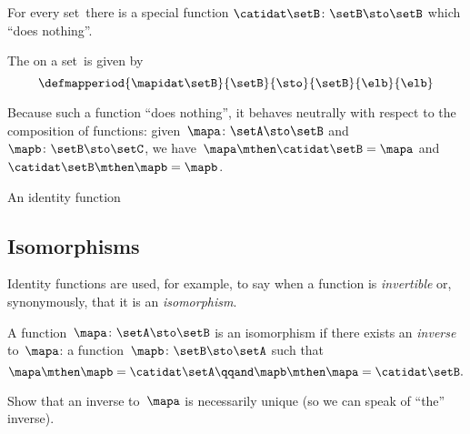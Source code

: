 For every set~\setB there is a special function $\catidat\setB \colon \setB \sto \setB$ which ``does nothing''.
\begin{ctdefinition}\label{def:identity-function}
    The  on a set~\setB is given by
    \begin{equation}
        \defmapperiod{
            \mapidat\setB
        }{
            \setB
        }{
            \sto
        }{
            \setB
        }{
            \elb
        }{
            \elb
        }
    \end{equation}
\end{ctdefinition}
Because such a function ``does nothing'', it behaves neutrally with respect to the composition of functions: given~$\mapa \colon \setA \sto \setB$ and~$\mapb \colon \setB \sto \setC$, we have~$\mapa \mthen \catidat\setB = \mapa$ and~$\catidat\setB \mthen \mapb = \mapb$.

\begin{marginfigure}
    \centering
    \caption{An identity function}
    \label{fig:identity-function}
\end{marginfigure}

\subsection{Isomorphisms}

Identity functions are used, for example, to say when a function is \emph{invertible} or, synonymously, that it is an \emph{isomorphism}.

\begin{ctdefinition}[Isomorphism]
    \label{def:function-isomorphism}
    A function~$\mapa \colon \setA \sto \setB$ is an isomorphism if there exists an \emph{inverse} to~$\mapa$: a function~$\mapb \colon \setB \sto \setA$ such that
    \begin{equation}
        \label{eq:isomorphism-equations}
        \mapa \mthen \mapb = \catidat\setA
        \qqand
        \mapb \mthen \mapa = \catidat\setB.
    \end{equation}
\end{ctdefinition}

\begin{exercise}\label{ex:uniqueness-of-inverse-function}
    Show that an inverse to~$\mapa$ is necessarily unique (so we can speak of ``the'' inverse).
\end{exercise}

